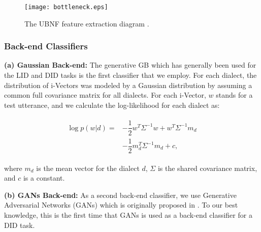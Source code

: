 \documentclass{article}
\begin{document}
\begin{figure}[htb]
\caption{The UBNF feature extraction diagram \cite{zhang2017ubnf}.}
\vspace{5pt}
\centerline{\texttt{[image: bottleneck.eps]}}
\label{fig:bottleneck}
\end{figure}

\subsubsection{Back-end Classifiers}
\label{sssec:classify}

\textbf{(a) Gaussian Back-end:} The generative GB which has generally been used for the LID and DID tasks is the first classifier that we employ. For each dialect, the distribution of i-Vectors was modeled by a Gaussian distribution by assuming a common full covariance matrix for all dialects. For each i-Vector, $w$ stands for a test utterance, and we calculate the log-likelihood for each dialect as:


\vspace*{-5pt}
\begin{eqnarray}
\label{eq:loglike}
\begin{split}
\log p(w|d) = &-\dfrac{1}{2}w^T \Sigma^{-1} w + w^T \Sigma^{-1} m_d \\
&- \dfrac{1}{2} m_d ^T \Sigma^{-1} m_d +c,
\end{split}
\end{eqnarray}

\noindent where $m_d$ is the mean vector for the dialect $d$, $\Sigma$ is the shared covariance matrix, and $c$ is a constant. 
 
\noindent \textbf{(b) GANs Back-end:} As a second back-end classifier, we use Generative Adversarial Networks (GANs) which is originally proposed in \cite{goodfellow2014generative}. To our best knowledge, this is the first time that GANs is used as a back-end classifier for a DID task.
\end{document}
